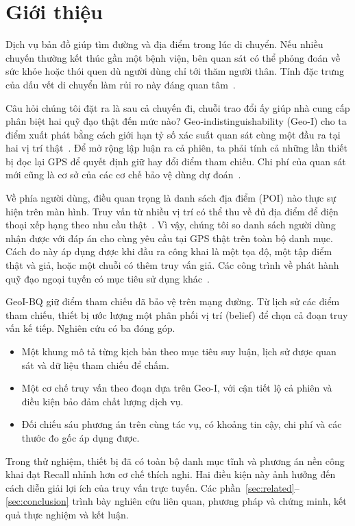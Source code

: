 \section{Giới thiệu}\label{sec:intro}
Dịch vụ bản đồ giúp tìm đường và địa điểm trong lúc di chuyển. Nếu nhiều chuyến thường kết thúc gần một bệnh viện, bên quan sát có thể phỏng đoán về sức khỏe hoặc thói quen dù người dùng chỉ tới thăm người thân. Tính đặc trưng của dấu vết di chuyển làm rủi ro này đáng quan tâm~\cite{mobilityunique}.

Câu hỏi chúng tôi đặt ra là sau cả chuyến đi, chuỗi trao đổi ấy giúp nhà
cung cấp phân biệt hai quỹ đạo thật đến mức nào? Geo-indistinguishability
(Geo-I) cho ta điểm xuất phát bằng cách giới hạn tỷ số xác suất quan sát cùng
một đầu ra tại hai vị trí thật~\cite{geoi}. Để mở rộng lập luận ra cả phiên,
ta phải tính cả những lần thiết bị đọc lại GPS để quyết định giữ hay đổi điểm
tham chiếu. Chi phí của quan sát mới cũng là cơ sở của các cơ chế bảo vệ dùng
dự đoán~\cite{predictive}.

Về phía người dùng, điều quan trọng là danh sách địa điểm (POI) nào thực sự
hiện trên màn hình. Truy vấn từ nhiều vị trí có thể thu về đủ địa điểm để
điện thoại xếp hạng theo nhu cầu thật~\cite{ev}. Vì vậy, chúng tôi so danh sách
người dùng nhận được với đáp án cho cùng yêu cầu tại GPS thật trên toàn bộ
danh mục. Cách đo này áp dụng được khi đầu ra công khai là một tọa độ, một
tập điểm thật và giả, hoặc một chuỗi có thêm truy vấn giả. Các công trình về
phát hành quỹ đạo ngoại tuyến có mục tiêu sử dụng khác~\cite{transprotect,semantic,fake,sok}.



GeoI-BQ giữ điểm tham chiếu đã bảo vệ trên mạng đường. Từ lịch sử các điểm
tham chiếu, thiết bị ước lượng một phân phối vị trí (belief) để chọn cả đoạn
truy vấn kế tiếp. Nghiên cứu có ba đóng góp.
\begin{itemize}
\item Một khung mô tả từng kịch bản theo mục tiêu suy luận, lịch sử được quan sát và dữ liệu tham chiếu để chấm.
\item Một cơ chế truy vấn theo đoạn dựa trên Geo-I, với cận tiết lộ cả phiên và điều kiện bảo đảm chất lượng dịch vụ.
\item Đối chiếu sáu phương án trên cùng tác vụ, có khoảng tin cậy, chi phí và các thước đo gốc áp dụng được.
\end{itemize}
Trong thử nghiệm, thiết bị đã có toàn bộ danh mục tĩnh và phương án nền
công khai đạt Recall nhỉnh hơn cơ chế thích nghi. Hai điều kiện này ảnh hưởng
đến cách diễn giải lợi ích của truy vấn trực tuyến.
Các phần~\ref{sec:related}--\ref{sec:conclusion} trình bày nghiên cứu liên quan,
phương pháp và chứng minh, kết quả thực nghiệm và kết luận.
